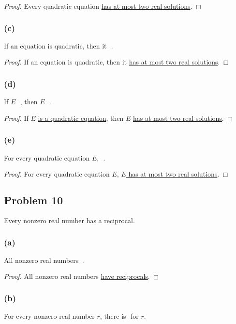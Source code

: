 \documentclass[14pt]{extarticle}
\newcommand{\fbl}{\underline{\hspace{1cm}}\,\,}
\begin{document}
\begin{proof}
Every quadratic equation \underline{has at most two real solutions}.
\end{proof}

\subsubsection{(c)}
If an equation is quadratic, then it \fbl.

\begin{proof}
If an equation is quadratic, then it \underline{has at most two real solutions}.
\end{proof}

\subsubsection{(d)}
If $E$ \fbl, then $E$ \fbl.

\begin{proof}
If $E$ \underline{is a quadratic equation}, then $E$ \underline{has at most two
real solutions}.
\end{proof}

\subsubsection{(e)}
For every quadratic equation $E$, \fbl.

\begin{proof}
For every quadratic equation $E$, \underline{$E$ has at most two real
solutions}.
\end{proof}

\subsection{Problem 10}
Every nonzero real number has a reciprocal.

\subsubsection{(a)}
All nonzero real numbers \fbl.

\begin{proof}
All nonzero real numbers \underline{have reciprocals}.
\end{proof}

\subsubsection{(b)}
For every nonzero real number $r$, there is \fbl for $r$.
\end{document}
